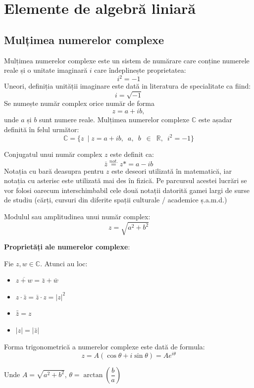 \section{Elemente de algebră liniară}

\subsection{Mulțimea numerelor complexe}

Mulțimea numerelor complexe este un sistem de numărare care conține numerele reale și o unitate imaginară $i$ care îndeplinește proprietatea:
\[i^2 = -1\]
Uneori, definiția unității imaginare este dată in literatura de specialitate ca fiind: \[i = \sqrt{-1}\]
Se numește număr complex orice număr de forma \[z = a + ib,\] unde $a$ și $b$ sunt numere reale. Mulțimea numerelor complexe $\mathbb{C}$ este așadar definită în felul următor: 
\[ \mathbb{C} = \{z \enspace|\; z = a + ib,\enspace a,\enspace b \enspace\in\enspace \mathbb{R},\enspace i^2 = -1\} \]

Conjugatul unui număr complex $z$ este definit ca:
\[\bar{z} \overset{not.}{=} z\text{*} = a - ib\]
Notația cu bară deasupra pentru $z$ este deseori utilizată în matematică, iar notația cu asterisc este utilizată mai des în fizică. Pe parcursul acestei lucrări se vor folosi oarecum interschimbabil cele două notații datorită gamei largi de surse de studiu (cărți, cursuri din diferite spații culturale / academice ș.a.m.d.)

Modulul sau amplitudinea unui număr complex:
\[z = \sqrt{a^2 + b^2}\]

\textbf{Proprietăți ale numerelor complexe}:

Fie $z, w \in \mathbb{C}$. Atunci au loc:
\begin{itemize}
    \item $\overline{z + w} = \bar{z} + \bar{w}$ 
    \item $z \cdot \bar{z} = \bar{z} \cdot z = |z|^2$
    \item $\bar{\bar{z}} = z$
    \item $|z| = |\bar{z}|$
\end{itemize}
\newpage

Forma trigonometrică a numerelor complexe este dată de formula:
\[z = A(\cos \theta + i \sin \theta) = Ae^{i\theta}\] 

Unde $A = \sqrt{a^2 + b^2}$,  $\theta = \arctan\left(\dfrac{b}{a}\right)$

